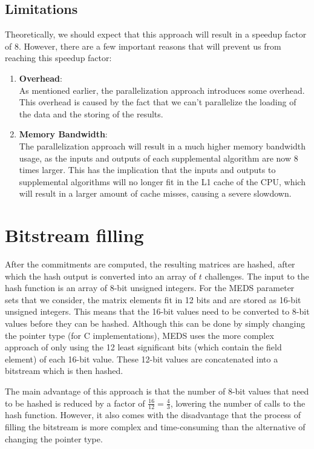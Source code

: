 \documentclass[11pt,a4paper]{report}
\theoremstyle{definition}
\begin{document}
\subsection{Limitations}
\label{sec:highlevellimitations}
Theoretically, we should expect that this approach will result in a speedup factor of 8. However, there are a few important reasons that will prevent us from reaching this speedup factor:
\begin{enumerate}
  \item \textbf{Overhead}:\\
  As mentioned earlier, the parallelization approach introduces some overhead. This overhead is caused by the fact that we can't parallelize the loading of the data and the storing of the results.
  \item \textbf{Memory Bandwidth}:\\
  The parallelization approach will result in a much higher memory bandwidth usage, as the inputs and outputs of each supplemental algorithm are now 8 times larger. This has the implication that the inputs and outputs to supplemental algorithms will no longer fit in the L1 cache of the CPU, which will result in a larger amount of cache misses, causing a severe slowdown.
\end{enumerate}

\section{Bitstream filling}
\label{sec:bitstreamfilling}
After the commitments are computed, the resulting matrices are hashed, after which the hash output is converted into an array of $t$ challenges. The input to the hash function is an array of 8-bit unsigned integers. For the MEDS parameter sets that we consider, the matrix elements fit in 12 bits and are stored as 16-bit unsigned integers. This means that the 16-bit values need to be converted to 8-bit values before they can be hashed. Although this can be done by simply changing the pointer type (for C implementations), MEDS uses the more complex approach of only using the 12 least significant bits (which contain the field element) of each 16-bit value. These 12-bit values are concatenated into a bitstream which is then hashed.

The main advantage of this approach is that the number of 8-bit values that need to be hashed is reduced by a factor of $\frac{16}{12} = \frac{4}{3}$, lowering the number of calls to the hash function. However, it also comes with the disadvantage that the process of filling the bitstream is more complex and time-consuming than the alternative of changing the pointer type.
\end{document}
